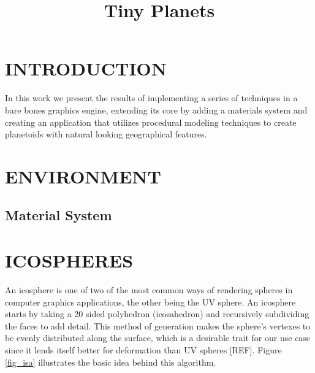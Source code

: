\documentclass[a4paper,twoside]{article}
\begin{document}
\title{Tiny Planets}

\author{
}



\onecolumn \maketitle \normalsize \vfill

\section{\uppercase{Introduction}}
\label{sec:introduction}
\noindent In this work we present the results of implementing a series of techniques in a bare bones graphics engine, extending its core by adding a materials system and creating an application that utilizes procedural modeling techniques to create planetoids with natural looking geographical features.

\section{\uppercase{Environment}}
\label{sec:env}

\subsection{Material System}
\label{sec:mat_sys}

\section{\uppercase{IcoSpheres}}
\label{sec:icosphere}
\noindent An icosphere is one of two of the most common ways of rendering spheres in computer graphics applications, the other being the UV sphere. An icosphere starts by taking a 20 sided polyhedron (icosahedron)  and recursively subdividing the faces to add detail. This method of generation makes the sphere's vertexes to be evenly distributed along the surface, which is a desirable trait for our use case since it lends itself better for deformation than UV spheres [REF]. Figure \ref{fig_isa} illustrates the basic idea behind this algorithm.
\end{document}
